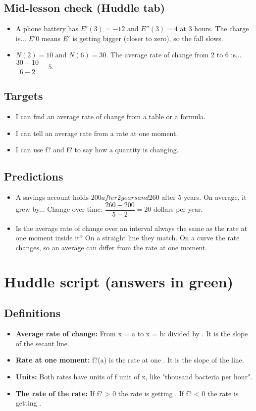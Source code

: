 \documentclass[11pt]{article}
\begin{document}
\subsection*{Mid-lesson check (Huddle tab)}\begin{itemize}
\item A phone battery has $E'(3)=-12$ and $E''(3)=4$ at 3 hours. The charge is...  $E'0$ means $E'$ is getting bigger (closer to zero), so the fall slows.
\item $N(2)=10$ and $N(6)=30$. The average rate of change from 2 to 6 is...  $\dfrac{30-10}{6-2}=5$.
\end{itemize}
\subsection*{Targets}\begin{itemize}\item I can find an average rate of change from a table or a formula.
\item I can tell an average rate from a rate at one moment.
\item I can use f? and f? to say how a quantity is changing.\end{itemize}
\subsection*{Predictions}\begin{itemize}
\item A savings account holds $200 after 2 years and $260 after 5 years. On average, it grew by...  Change over time: $\dfrac{260-200}{5-2}=20$ dollars per year.
\item Is the average rate of change over an interval always the same as the rate at one moment inside it?  On a straight line they match. On a curve the rate changes, so an average can differ from the rate at one moment.
\end{itemize}
\section*{Huddle script (answers in green)}
\subsection*{Definitions}\begin{itemize}
\item \textbf{Average rate of change:} From x = a to x = b:  divided by . It is the slope of the secant line.
\item \textbf{Rate at one moment:} f?(a) is the rate at one . It is the slope of the  line.
\item \textbf{Units:} Both rates have units of f  unit of x, like "thousand bacteria per hour".
\item \textbf{The rate of the rate:} If f? > 0 the rate is getting . If f? < 0 the rate is getting .
\end{itemize}
\end{document}
